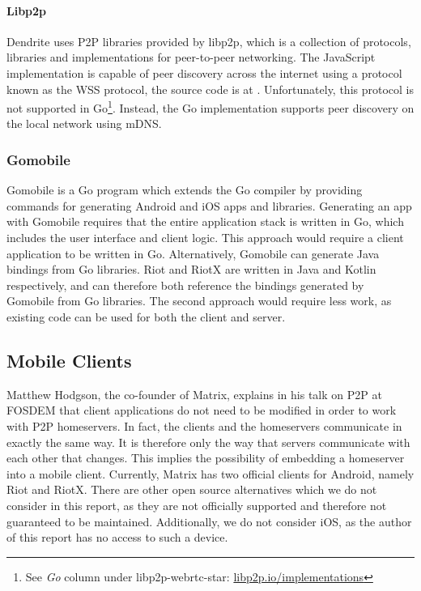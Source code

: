 \paragraph{Libp2p}
Dendrite uses \ac{P2P} libraries provided by libp2p, which is a collection of protocols, libraries and implementations for peer-to-peer networking\cite{libp2p}.
The JavaScript implementation is capable of peer discovery across the internet using a protocol known as the \ac{WSS} protocol, the source code is at .
Unfortunately, this protocol is not supported in Go\footnote{See \textit{Go} column under libp2p-webrtc-star: \url{libp2p.io/implementations}}.
Instead, the Go implementation supports peer discovery on the local network using \ac{mDNS}.

\subsubsection{Gomobile}\label{sec:gomobile}
Gomobile is a Go program which extends the Go compiler by providing commands for generating Android and iOS apps and libraries\cite{gomobile}.
Generating an app with Gomobile requires that the entire application stack is written in Go, which includes the user interface and client logic.
This approach would require a client application to be written in Go.
Alternatively, Gomobile can generate Java bindings from Go libraries.
Riot and RiotX are written in Java and Kotlin respectively, and can therefore both reference the bindings generated by Gomobile from Go libraries.
The second approach would require less work, as existing code can be used for both the client and server.

\subsection{Mobile Clients}\label{sec:official_clients}
Matthew Hodgson, the co-founder of Matrix, explains in his talk on \ac{P2P} at FOSDEM\cite{fosdem_event_p2p_matrix} that client applications do not need to be modified in order to work with \ac{P2P} homeservers.
In fact, the clients and the homeservers communicate in exactly the same way.
It is therefore only the way that servers communicate with each other that changes.
This implies the possibility of embedding a homeserver into a mobile client.
Currently, Matrix has two official clients for Android, namely Riot and RiotX.
There are other open source alternatives which we do not consider in this report, as they are not officially supported and therefore not guaranteed to be maintained.
Additionally, we do not consider iOS, as the author of this report has no access to such a device.

